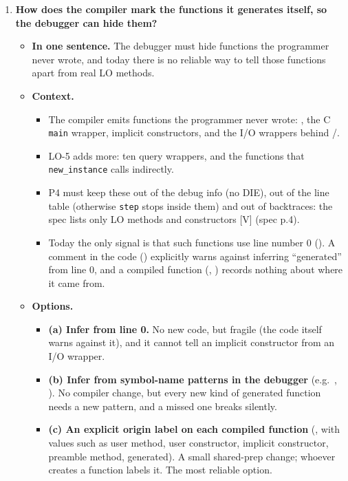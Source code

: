 \documentclass[10pt]{article}
\newcommand{\code}[1]{\texttt{\small #1}}
\newcommand{\mV}{\textsf{\scriptsize[V]}}
\newcommand{\field}[1]{\textbf{#1}\enspace}
\newcommand{\decitem}[1]{\needspace{6\baselineskip}\setcounter{enumi}{\numexpr#1-1\relax}\item}
\begin{document}
\begin{enumerate}[label=\textbf{\arabic*.},ref=\arabic*,leftmargin=1.8em,itemsep=0.8em]
\decitem{5}\label{dec:origin}\textbf{How does the compiler mark the functions it generates itself, so the debugger can hide them?}
\begin{itemize}
\item[] \field{In one sentence.} The debugger must hide functions the programmer never wrote, and today there is no reliable way to tell those functions apart from real LO methods.
\item[] \field{Context.}
\begin{itemize}
\item The compiler emits functions the programmer never wrote: , the C \code{main} wrapper, implicit constructors, and the I/O wrappers behind /.
\item LO-5 adds more: ten  query wrappers, and the  functions that \code{new\_instance} calls indirectly.
\item P4 must keep these out of the debug info (no DIE), out of the line table (otherwise \code{step} stops inside them) and out of backtraces: the spec lists only LO methods and constructors \mV{} (spec p.4).
\item Today the only signal is that such functions use line number 0 (). A comment in the code () explicitly warns against inferring ``generated'' from line 0, and a compiled function (, ) records nothing about where it came from.
\end{itemize}
\item[] \field{Options.}
\begin{itemize}
\item \textbf{(a) Infer from line 0.} No new code, but fragile (the code itself warns against it), and it cannot tell an implicit constructor from an I/O wrapper.
\item \textbf{(b) Infer from symbol-name patterns in the debugger} (e.g.\ , ). No compiler change, but every new kind of generated function needs a new pattern, and a missed one breaks silently.
\item \textbf{(c) An explicit origin label on each compiled function} (, with values such as user method, user constructor, implicit constructor, preamble method, generated). A small shared-prep change; whoever creates a function labels it. The most reliable option.
\end{itemize}

\end{itemize}
\end{enumerate}
\end{document}
